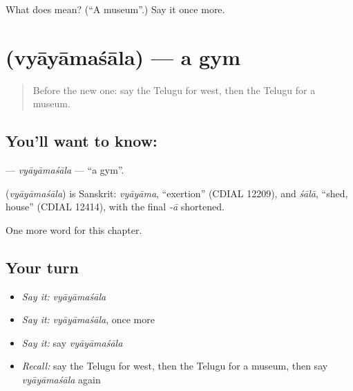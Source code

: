 \begin{tcolorbox}[breakable,colback=teal!4,colframe=teal!35!black,title={Before you move on}]
What does  mean? (\textquotedblleft{}A museum\textquotedblright{}.) Say it once more.
\end{tcolorbox}
\section[\texorpdfstring{\te{వ్యాయామశాల} (vyāyāmaśāla)}{వ్యాయామశాల (vyāyāmaśāla)}]{ (vyāyāmaśāla) — a gym}

\label{lesson:TE-C255-vyayamasala}



\begin{quote}
Before the new one: say the Telugu for west, then the Telugu for a museum.
\end{quote}

\subsection*{You'll want to know: }
\textbf{} — \emph{vyāyāmaśāla} — \textquotedblleft{}a gym\textquotedblright{}.

\begin{cousinweb}
\textbf{} (\emph{vyāyāmaśāla}) is Sanskrit: \emph{vyāyāma}, \textquotedblleft{}exertion\textquotedblright{} (CDIAL 12209), and \emph{śālā}, \textquotedblleft{}shed, house\textquotedblright{} (CDIAL 12414), with the final \emph{-ā} shortened.
\end{cousinweb}

\begin{grammarlens}[title={What you've built}]
One more word for this chapter.
\end{grammarlens}

\subsection*{Your turn}
\begin{itemize}
\raggedright
  \item \emph{Say it:} \emph{vyāyāmaśāla}
  \item \emph{Say it:} \emph{vyāyāmaśāla}, once more
  \item \emph{Say it:} say \emph{vyāyāmaśāla}
  \item \emph{Recall:} say the Telugu for west, then the Telugu for a museum, then say \emph{vyāyāmaśāla} again
\end{itemize}

